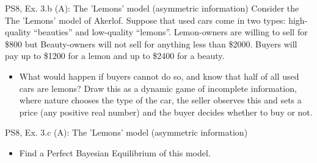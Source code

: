 \begin{frame}{PS8, Ex. 3.b (A): The 'Lemons' model (asymmetric information)}
    Consider the The 'Lemons' model of Akerlof. Suppose that used cars come in two types: high-quality “beauties” and low-quality “lemons”. Lemon-owners are willing to sell for \$800 but Beauty-owners will not sell for anything less than \$2000. Buyers will pay up to \$1200 for a lemon and up to \$2400 for a beauty.
    \begin{itemize}
      \item[(b)] What would happen if buyers cannot do so, and know that half of all used cars are lemons? Draw this as a dynamic game of incomplete information, where nature chooses the type of the car, the seller observes this and sets a price (any positive real number) and the buyer decides whether to buy or not.
    \end{itemize}
    \vspace{-8pt}
    \begin{multicols}{2}
      \vfill\null\columnbreak
      \vfill\null
    \end{multicols}
\end{frame}

\begin{frame}{PS8, Ex. 3.c (A): The 'Lemons' model (asymmetric information)}
    \begin{itemize}
      \item[(c)] Find a Perfect Bayesian Equilibrium of this model.
    \end{itemize}
    \vspace{-8pt}
    \begin{multicols}{2}
      \vfill\null\columnbreak
      \vfill\null
    \end{multicols}
\end{frame}
